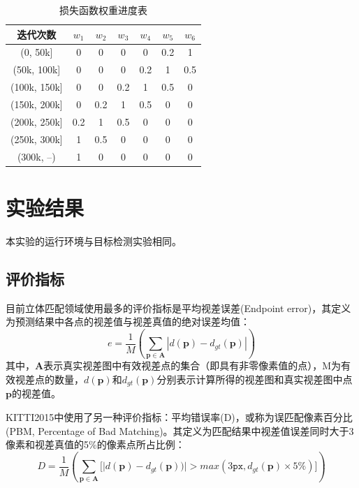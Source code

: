 \begin{table}[htb]
	\centering
	\caption{损失函数权重进度表}
	\label{tab:4_2_loss_weight_schedule}
	\begin{small} %
		\begin{tabular*}{\textwidth}{@{\extracolsep{\fill}}ccccccc} \toprule[2pt]
			迭代次数  & $w_1$ & $w_2$ & $w_3$ & $w_4$ & $w_5$ & $w_6$ \\ \midrule[1pt]
			(0, 50k]           & 0 & 0 & 0 & 0 & 0.2 & 1 \\
			(50k, 100k]     & 0 & 0 & 0 & 0.2 & 1 & 0.5 \\
			(100k, 150k]    & 0 & 0 & 0.2 & 1 & 0.5 & 0 \\
			(150k, 200k]    & 0 & 0.2 & 1 & 0.5 & 0 & 0 \\
			(200k, 250k]    & 0.2 & 1 & 0.5 & 0 & 0 & 0  \\
			(250k, 300k]    & 1 & 0.5 & 0 & 0 & 0 & 0  \\
			(300k, --)          & 1 & 0 & 0 & 0 & 0 & 0 \\ \bottomrule[2pt]
		\end{tabular*}
	\end{small} %
\end{table}

\section{实验结果}
本实验的运行环境与目标检测实验相同。

\subsection{评价指标}
目前立体匹配领域使用最多的评价指标是平均视差误差(Endpoint error)，其定义为预测结果中各点的视差值与视差真值的绝对误差均值：
\begin{equation}\label{eq:4_3_endpoint_error}
e = \frac{1}{M} \left( \sum_{\mathbf{p} \in \mathbf{A}} | d(\mathbf{p}) - d_{gt}(\mathbf{p}) | \right)
\end{equation}
其中，$\mathbf{A}$表示真实视差图中有效视差点的集合（即具有非零像素值的点），M为有效视差点的数量，$d(\mathbf{p})$和$d_{gt}(\mathbf{p})$分别表示计算所得的视差图和真实视差图中点$\mathbf{p}$的视差值。

KITTI2015中使用了另一种评价指标：平均错误率(D)，或称为误匹配像素百分比(PBM, Percentage of Bad Matching)。其定义为匹配结果中视差值误差同时大于3像素和视差真值的5\%的像素点所占比例：
\begin{equation}\label{eq:4_3_D1_error}
D = \frac{1}{M}\left( \sum_{\mathbf{p} \in \mathbf{A}} \Big[ \big| d(\mathbf{p}) - d_{gt}(\mathbf{p})) \big| > max(3\mathtt{px}, d_{gt}(\mathbf{p}) \times 5\%) \Big] \right)
\end{equation}

